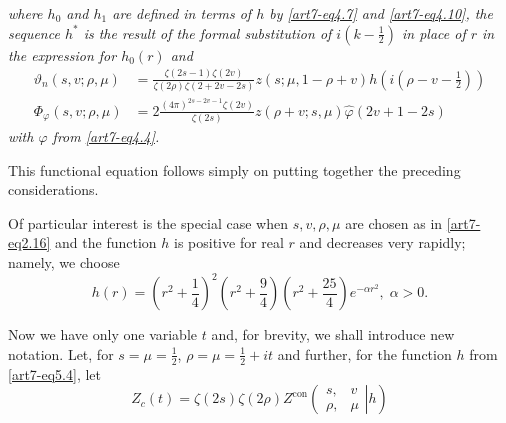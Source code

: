 \textit{where $h_0$ and $h_1$ are defined in terms of $h$ by \eqref{art7-eq4.7} and \eqref{art7-eq4.10}, the sequence $h^\ast$ is the result of the formal substitution of $i(k-\frac{1}{2})$ in place of $r$ in the expression for $h_0(r)$ and}
\begin{align}
\vartheta_n(s, v; \rho, \mu) & = \frac{\zeta(2s-1) \zeta(2v)}{\zeta(2\rho) \zeta (2+2v-2s)} z (s;\mu, 1-\rho + v) h(i(\rho - v - \frac{1}{2}))
\label{art7-eq5.2}\\
\Phi_\varphi (s, v; \rho, \mu) & = 2 \frac{(4\pi)^{2s-2v-1} \zeta (2v)}{\zeta(2s)} z (\rho + v; s , \mu) \hat{\varphi } (2 v+ 1 - 2s)  
\label{art7-eq5.3}
\end{align}
\textit{with $\varphi$ from \eqref{art7-eq4.4}.}

This functional equation follows simply on putting together the preceding considerations. 

Of particular interest is the special case when $s, v, \rho, \mu$ are chosen as in \eqref{art7-eq2.16} and the function $h$ is positive for real $r$ and decreases very rapidly; namely, we choose 
\begin{equation}
h(r) = (r^2+ \frac{1}{4})^2 (r^2 + \frac{9}{4}) (r^2 + \frac{25}{4}) e^{-\alpha r^2}, \; \alpha > 0.
\label{art7-eq5.4}
\end{equation}

Now we have only one variable $t$ and, for brevity, we shall introduce new notation. Let, for $s = \mu = \frac{1}{2}$, $\rho= \mu = \frac{1}{2} +it$ and further, for the function $h$ from \eqref{art7-eq5.4}, let
\begin{equation}
Z_c (t) = \zeta (2s) \zeta(2\rho) Z^{\text{con}} 
\left(
\left.
\begin{matrix}
s, & v \\
\rho, & \mu
\end{matrix}
\right| h
\right)
\label{art7-eq5.5}
\end{equation}

